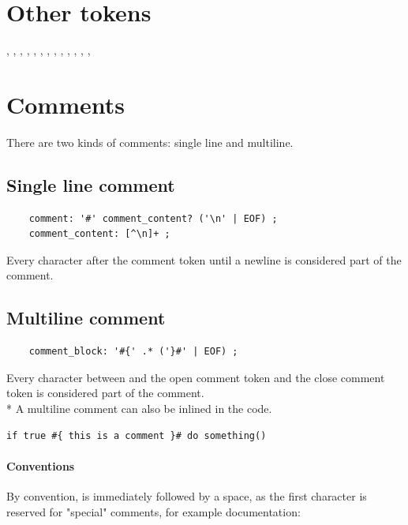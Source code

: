 \section{Other tokens}

, \code{:}, \code{,}, \code{;}, \code{\#}, \code{(}, \code{)}, \code{[}, \code{]},
\code{\{}, \code{\}}, \code{<}, \code{>}, \code{=>}

\section{Comments}

There are two kinds of comments: single line and multiline.

\subsection{Single line comment}

\begin{verbatim}
	comment: '#' comment_content? ('\n' | EOF) ;
	comment_content: [^\n]+ ;
\end{verbatim}

Every character after the comment token \code{\#} until a newline \code{\\n} is
considered part of the comment.

\subsection{Multiline comment}

\begin{verbatim}
	comment_block: '#{' .* ('}#' | EOF) ;
\end{verbatim}

Every character between and the open comment token \code{\#\{} and the close
comment token \code{\}\#} is considered part of the comment.\\*
A multiline comment can also be inlined in the code.

\begin{verbatim}
if true #{ this is a comment }# do something()
\end{verbatim}

\paragraph{Conventions} By convention, \code{\#} is immediately followed by
a space, as the first character is reserved for "special" comments, for example
documentation: 

